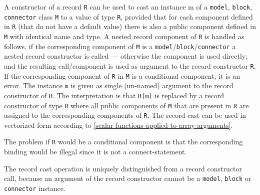 A constructor of a record \lstinline!R! can be used to cast an instance m of a
\lstinline!model!, \lstinline!block!, \lstinline!connector! class \lstinline!M! to a value of type \lstinline!R!, provided that for
each component defined in \lstinline!R! (that do not have a default value) there is
also a public component defined in \lstinline!M! with identical name and type. A
nested record component of \lstinline!R! is handled as follows, if the corresponding
component of \lstinline!M! is a \lstinline!model!/\lstinline!block!/\lstinline!connector! a nested record constructor is
called --- otherwise the component is used directly; and the resulting
call/component is used as argument to the record constructor \lstinline!R!. If the
corresponding component of \lstinline!R! in \lstinline!M! is a conditional component, it is an
error. The instance \lstinline!m! is given as single (un-named)
argument to the record constructor of \lstinline!R!. The interpretation is that \lstinline!R(m)!
is replaced by a record constructor of type \lstinline!R! where all public
components of \lstinline!M! that are present in \lstinline!R! are assigned to the corresponding
components of \lstinline!R!. The record cast can be used in vectorized form
according to \autoref{scalar-functions-applied-to-array-arguments}.

\begin{nonnormative}
The problem if \lstinline!R! would be a conditional component is that the corresponding binding would be illegal since it is not a
connect-statement.
\end{nonnormative}

\begin{nonnormative}
The record cast operation is uniquely distinguished from a record constructor call, because an argument of the record constructor cannot
be a \lstinline!model!, \lstinline!block! or \lstinline!connector! instance.
\end{nonnormative}

